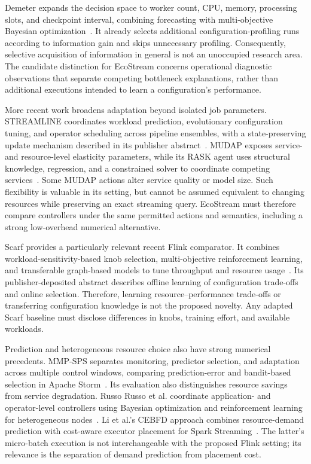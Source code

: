 Demeter expands the decision space to worker count, CPU, memory, processing slots, and checkpoint interval, combining forecasting with multi-objective Bayesian optimization~\cite{geldenhuys2024demeter}. It already selects additional configuration-profiling runs according to information gain and skips unnecessary profiling. Consequently, selective acquisition of information in general is not an unoccupied research area. The candidate distinction for EcoStream concerns operational diagnostic observations that separate competing bottleneck explanations, rather than additional executions intended to learn a configuration's performance.

More recent work broadens adaptation beyond isolated job parameters. STREAMLINE coordinates workload prediction, evolutionary configuration tuning, and operator scheduling across pipeline ensembles, with a state-preserving update mechanism described in its publisher abstract~\cite{pedratscher2025streamline}. MUDAP exposes service- and resource-level elasticity parameters, while its RASK agent uses structural knowledge, regression, and a constrained solver to coordinate competing services~\cite{sedlak2026mudap}. Some MUDAP actions alter service quality or model size. Such flexibility is valuable in its setting, but cannot be assumed equivalent to changing resources while preserving an exact streaming query. EcoStream must therefore compare controllers under the same permitted actions and semantics, including a strong low-overhead numerical alternative.

Scarf provides a particularly relevant recent Flink comparator. It combines workload-sensitivity-based knob selection, multi-objective reinforcement learning, and transferable graph-based models to tune throughput and resource usage~\cite{liu2026scarf}. Its publisher-deposited abstract describes offline learning of configuration trade-offs and online selection. Therefore, learning resource--performance trade-offs or transferring configuration knowledge is not the proposed novelty. Any adapted Scarf baseline must disclose differences in knobs, training effort, and available workloads.

Prediction and heterogeneous resource choice also have strong numerical precedents. MMP-SPS separates monitoring, predictor selection, and adaptation across multiple control windows, comparing prediction-error and bandit-based selection in Apache Storm~\cite{wladdimiro2026mmpsps}. Its evaluation also distinguishes resource savings from service degradation. Russo Russo et al. coordinate application- and operator-level controllers using Bayesian optimization and reinforcement learning for heterogeneous nodes~\cite{russorusso2023hierarchical}. Li et al.'s CEBFD approach combines resource-demand prediction with cost-aware executor placement for Spark Streaming~\cite{li2024cebfd}. The latter's micro-batch execution is not interchangeable with the proposed Flink setting; its relevance is the separation of demand prediction from placement cost.

